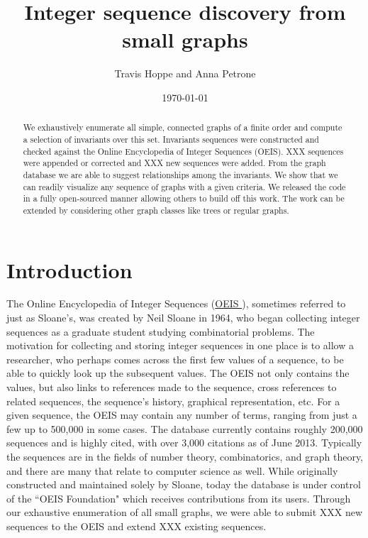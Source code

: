 \documentclass[12pt]{article}
\newcommand{\OEIS}[1]
{\href{https://oeis.org/#1}{OEIS \texttt{#1}}}
\begin{document}
\setlength{\parindent}{0cm}

\title{Integer sequence discovery from small graphs}
\author{Travis Hoppe and Anna Petrone}
\date{\today}
\maketitle

\begin{abstract}
We exhaustively enumerate all simple, connected graphs of a finite order and compute a selection of invariants over this set.
Invariants sequences were constructed and checked against the Online Encyclopedia of Integer Sequences (OEIS).
XXX sequences were appended or corrected and XXX new sequences were added.
From the graph database we are able to suggest relationships among the invariants.
We show that we can readily visualize any sequence of graphs with a given criteria.
We released the code in a fully open-sourced manner allowing others to build off this work.
The work can be extended by considering other graph classes like trees or regular graphs.
\end{abstract}

\section{Introduction}

The Online Encyclopedia of Integer Sequences (\OEIS{}), sometimes referred to just as Sloane's, was created by Neil Sloane in 1964, who began collecting integer sequences as a graduate student studying combinatorial problems. 
The motivation for collecting and storing integer sequences in one place is to allow a researcher, who perhaps comes across the first few values of a sequence, to be able to quickly look up the subsequent values. 
The OEIS not only contains the values, but also links to references made to the sequence, cross references to related sequences, the sequence's history, graphical representation, etc. 
For a given sequence, the OEIS may contain any number of terms, ranging from just a few up to 500,000 in some cases. 
The database currently contains roughly 200,000 sequences and is highly cited, with over 3,000 citations as of June 2013. 
Typically the sequences are in the fields of number theory, combinatorics, and graph theory, and there are many that relate to computer science as well. 
While originally constructed and maintained solely by Sloane, today the database is under control of the ``OEIS Foundation" which receives contributions from its users. 
Through our exhaustive enumeration of all small graphs, we were able to submit XXX new sequences to the OEIS and extend XXX existing sequences.
\end{document}
